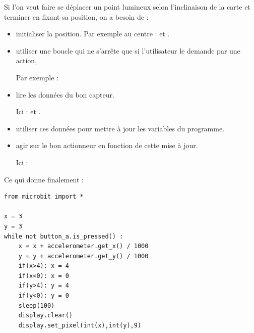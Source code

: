Si l'on veut faire se déplacer un point lumineux selon l'inclinaison de la carte et terminer en fixant sa position, on a besoin de :

\begin{itemize}
	\item initialiser la position. Par exemple au centre :  et .
	\item utiliser une boucle qui ne s'arrête que si l'utilisateur le demande par une action,
	      
	       Par exemple : 
	\item lire les données du bon capteur.
	
	Ici :  et .
	
	\item utiliser ces données pour mettre à jour les variables du programme.
	
	\item agir sur le bon actionneur en fonction de cette mise à jour.
	
	Ici :  
	
\end{itemize}

Ce qui donne finalement :

\begin{verbatim}
from microbit import *

x = 3
y = 3
while not button_a.is_pressed() :
    x = x + accelerometer.get_x() / 1000
    y = y + accelerometer.get_y() / 1000
    if(x>4): x = 4
    if(x<0): x = 0
    if(y>4): y = 4
    if(y<0): y = 0
    sleep(100)
    display.clear()
    display.set_pixel(int(x),int(y),9)
\end{verbatim}














